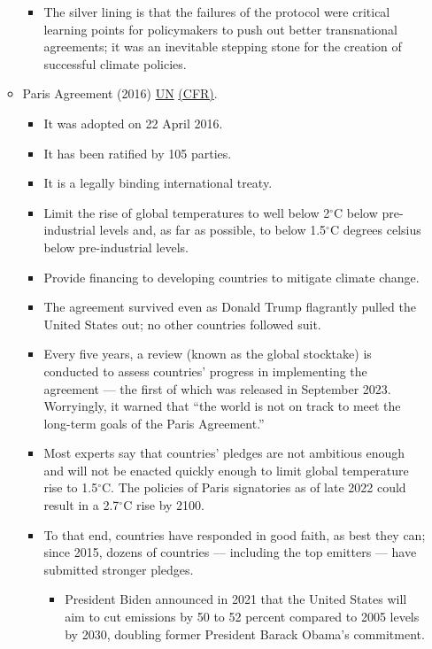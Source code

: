 \documentclass[oneside]{book}
\begin{document}
\begin{enumerate}
\begin{itemize}
\begin{itemize}
            \item The silver lining is that the failures of the protocol were critical learning points for policymakers to push out better transnational agreements; it was an inevitable stepping stone for the creation of successful climate policies. 
        \end{itemize}
        \item Paris Agreement (2016) \href{https://www.un.org/en/climatechange/paris-agreement}{UN} \href{https://www.cfr.org/backgrounder/paris-global-climate-change-agreements}{(CFR)}. 
        \begin{itemize}
            \item It was adopted on 22 April 2016.
            \item It has been ratified by 105 parties.
            \item It is a legally binding international treaty.
            \item Limit the rise of global temperatures to well below 2\(^{\circ}\text{C}\) below pre-industrial levels and, as far as possible, to below 1.5\(^{\circ}\text{C}\) degrees celsius below pre-industrial levels.
            \item Provide financing to developing countries to mitigate climate change.
            \item The agreement survived even as Donald Trump flagrantly pulled the United States out; no other countries followed suit.
            \item Every five years, a review (known as the global stocktake) is conducted to assess countries' progress in implementing the agreement --- the first of which was released in September 2023. Worryingly, it warned that ``the world is not on track to meet the long-term goals of the Paris Agreement.''
            \item Most experts say that countries' pledges are not ambitious enough and will not be enacted quickly enough to limit global temperature rise to 1.5\(^{\circ}\text{C}\). The policies of Paris signatories as of late 2022 could result in a 2.7\(^{\circ}\text{C}\) rise by 2100.
            \item To that end, countries have responded in good faith, as best they can; since 2015, dozens of countries --- including the top emitters --- have submitted stronger pledges. 
            \begin{itemize}
                \item President Biden announced in 2021 that the United States will aim to cut emissions by 50 to 52 percent compared to 2005 levels by 2030, doubling former President Barack Obama's commitment.

\end{itemize}
\end{itemize}
\end{itemize}
\end{enumerate}
\end{document}
